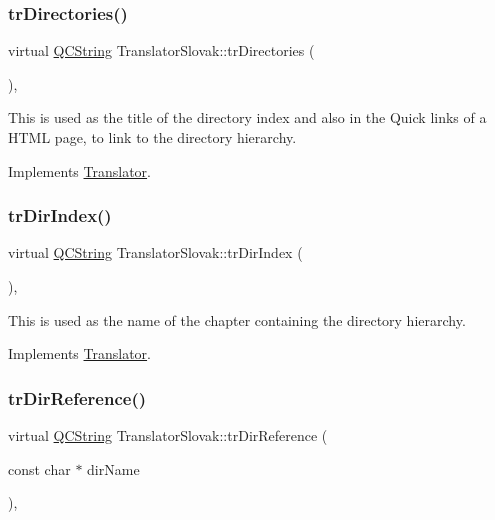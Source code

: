 \subsubsection{\texorpdfstring{trDirectories()}{trDirectories()}}
{\footnotesize\ttfamily virtual \mbox{\hyperlink{class_q_c_string}{Q\+C\+String}} Translator\+Slovak\+::tr\+Directories (\begin{DoxyParamCaption}{ }\end{DoxyParamCaption})\hspace{0.3cm}{\ttfamily [inline]}, {\ttfamily [virtual]}}

This is used as the title of the directory index and also in the Quick links of a H\+T\+ML page, to link to the directory hierarchy. 

Implements \mbox{\hyperlink{class_translator}{Translator}}.

\mbox{\label{class_translator_slovak_a3515fab77b0a7dd2383eeec8380f9c6c}} 
\subsubsection{\texorpdfstring{trDirIndex()}{trDirIndex()}}
{\footnotesize\ttfamily virtual \mbox{\hyperlink{class_q_c_string}{Q\+C\+String}} Translator\+Slovak\+::tr\+Dir\+Index (\begin{DoxyParamCaption}{ }\end{DoxyParamCaption})\hspace{0.3cm}{\ttfamily [inline]}, {\ttfamily [virtual]}}

This is used as the name of the chapter containing the directory hierarchy. 

Implements \mbox{\hyperlink{class_translator}{Translator}}.

\mbox{\label{class_translator_slovak_ae0e886d1f219c0396ed8365d99df95b0}} 
\subsubsection{\texorpdfstring{trDirReference()}{trDirReference()}}
{\footnotesize\ttfamily virtual \mbox{\hyperlink{class_q_c_string}{Q\+C\+String}} Translator\+Slovak\+::tr\+Dir\+Reference (\begin{DoxyParamCaption}\item[{const char $\ast$}]{dir\+Name }\end{DoxyParamCaption})\hspace{0.3cm}{\ttfamily [inline]}, {\ttfamily [virtual]}}

